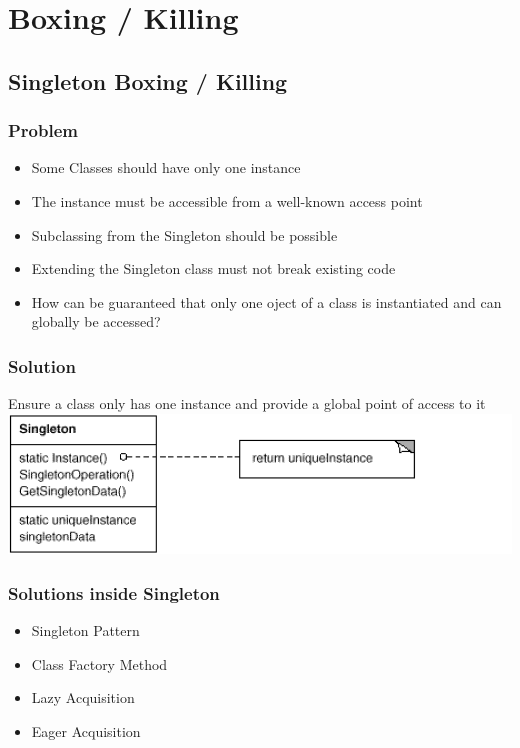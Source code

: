 \section{Boxing / Killing}
\subsection{Singleton Boxing / Killing}
\subsubsection{Problem}
\begin{itemize}
    \item Some Classes should have only one instance
    \item The instance must be accessible from a well-known access point 
    \item Subclassing from the Singleton should be possible
    \item Extending the Singleton class must not break existing code
    \item How can be guaranteed that only one oject of a class is instantiated and can globally be accessed?
\end{itemize}
\subsubsection{Solution}
Ensure a class only has one instance and provide a global point of access to it 
\includegraphics[width=\linewidth]{./img/singleton.png}
\subsubsection{Solutions inside Singleton}
\begin{itemize}
    \item Singleton Pattern
    \item Class Factory Method
    \item Lazy Acquisition
    \item Eager Acquisition
\end{itemize}
